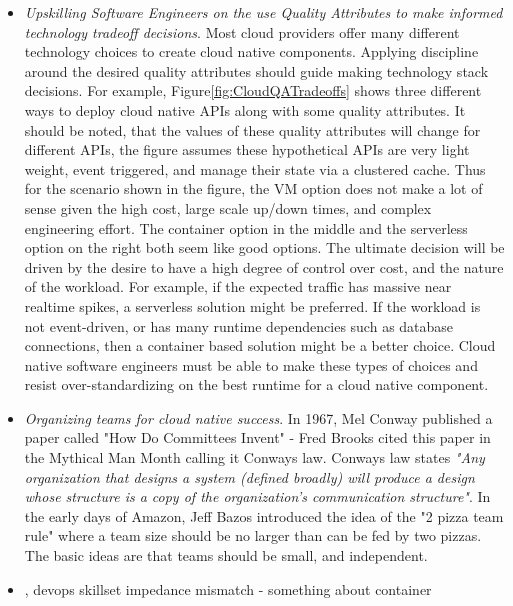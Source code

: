 \documentclass[conference]{IEEEconf}
\begin{document}
\begin{itemize}
	\item \textit{Upskilling Software Engineers on the use Quality Attributes to make informed technology tradeoff decisions}. Most cloud providers offer many different technology choices to create cloud native components.  Applying discipline around the desired quality attributes should guide making technology stack decisions. For example, Figure\ref{fig:CloudQATradeoffs} shows three different ways to deploy cloud native APIs along with some quality attributes.  It should be noted, that the values of these quality attributes will change for different APIs, the figure assumes these hypothetical APIs are very light weight, event triggered, and manage their state via a clustered cache.  Thus for the scenario shown in the figure, the VM option does not make a lot of sense given the high cost, large scale up/down times, and complex engineering effort.  The container option in the middle and the serverless option on the right both seem like good options.  The ultimate decision will be driven by the desire to have a high degree of control over cost, and the nature of the workload. For example, if the expected traffic has massive near realtime spikes, a serverless solution might be preferred. If the workload is not event-driven, or has many runtime dependencies such as database connections, then a container based solution might be a better choice. Cloud native software engineers must be able to make these types of choices and resist over-standardizing on the best runtime for a cloud native component.    
	
	\item \textit{Organizing teams for cloud native success}.  In 1967, Mel Conway published a paper called "How Do Committees Invent" - Fred Brooks cited this paper in the Mythical Man Month\cite{Brooks1975} calling it Conways law\cite{ConwaysLaw}. Conways law states \textit{"Any organization that designs a system (defined broadly) will produce a design whose structure is a copy of the organization's communication structure"}.  In the early days of Amazon, Jeff Bazos introduced the idea of the "2 pizza team rule"\cite{TwoPizza} where a team size should be no larger than can be fed by two pizzas.  The basic ideas are that teams should be small, and independent.   
	\item 
	
	, devops skillset impedance mismatch - something about container
	
\end{itemize} 
\end{document}
